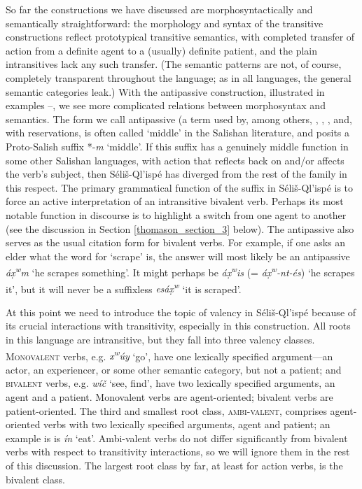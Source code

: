 \documentclass[output=paper,colorlinks,citecolor=brown]{langscibook}
\begin{document}
So far the constructions we have discussed are morphosyntactically and
semantically straightforward: the morphology and syntax of the
transitive constructions reflect prototypical transitive semantics,
with completed transfer of action from a definite agent to a (usually)
definite patient, and the plain intransitives lack any such transfer.
(The semantic patterns are not, of course, completely transparent
throughout the language; as in all languages, the general semantic
categories leak.)  With the antipassive construction, illustrated in
examples --, we see more complicated relations between morphosyntax and
semantics.  The form we call antipassive (a term used by, among
others, \citet[31]{Kroeber:1999}, \citet{Darnell:1990}, \citet{Gerdts:1993}, and,
with reservations, \citet[102]{Thompson&Thompson:1992} is often
called `middle' in the Salishan literature, and \citet[158]{Newman:1980}
posits a Proto-Salish suffix *-\emph{m} `middle'.  If this suffix has a
genuinely middle function in some other Salishan languages, with
action that reflects back on and/or affects the verb's subject, then
S\'eli\v{s}-Ql'isp\'e has diverged from the rest of the family in this
respect.  The primary grammatical function of the suffix in
S\'eli\v{s}-Ql'isp\'e is to force an active interpretation of an
intransitive bivalent verb.  Perhaps its most notable function in
discourse is to highlight a switch from one agent to another (see the
discussion in Section \ref{thomason_section_3} below).  The antipassive also serves as the usual
citation form for bivalent verbs.  For example, if one asks an elder
what the word for `scrape' is, the answer will most likely be an
antipassive \emph{\textglotstop\'a{\d{x}\textsuperscript w}m} `he
scrapes something'.  It might perhaps be \emph{\textglotstop\'a{\d{x}\textsuperscript w}is} (= \emph{\textglotstop\'a{\d{x}\textsuperscript w}-nt-\'es}) `he scrapes it',
but it will never be a suffixless \emph{es\textglotstop\'a\d{x}\textsuperscript w} `it is scraped'.

At this point we need to introduce the topic of valency in
S\'eli\v{s}-Ql'isp\'e because of its crucial interactions with
transitivity, especially in this construction.  All roots in this
language are intransitive, but they fall into three valency
classes. \textsc{Monovalent} verbs, e.g. \emph{x\textsuperscript w\'uy}
`go', have one lexically specified argument---an actor, an
experiencer, or some other semantic category, but not a patient; and
\textsc{bivalent} verbs, e.g. \emph{w\'i\v{c}} `see, find', have two
lexically specified arguments, an agent and a patient.  Monovalent
verbs are agent-oriented; bivalent verbs are patient-oriented.  The
third and smallest root class, \textsc{ambi-valent}, comprises\newline
agent-oriented verbs with two lexically specified arguments, agent and
patient; an example is is \emph{\textglotstop\'i{\textltilde}n} `eat'.
Ambi-valent verbs do not differ significantly from bivalent verbs with
respect to transitivity interactions, so we will ignore them in the
rest of this discussion.  The largest root class by far, at least for
action verbs, is the bivalent class.
\end{document}
